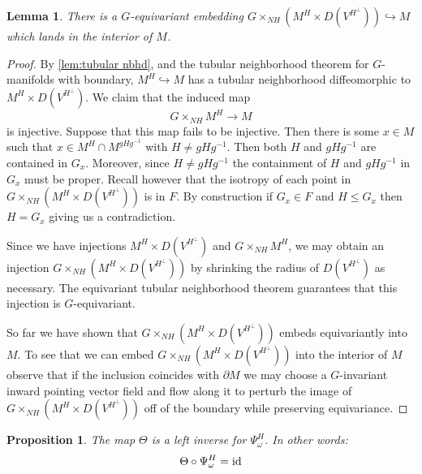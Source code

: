 \documentclass[11pt]{amsart}
\newcommand{\id}{\textup{id}}
\theoremstyle{plain}   %
\newtheorem{lem}[thm]{Lemma}
\newtheorem{prop}[thm]{Proposition}
\theoremstyle{definition}
\theoremstyle{remark}
\numberwithin{equation}{section}
\begin{document}
\begin{lem}\label{lem:embedding}
There is a $G$-equivariant embedding $G\times_{NH}(M^H\times D(V^{H^\perp}))\hookrightarrow M$ which lands in the interior of $M$.
\end{lem}

\begin{proof}
By \cref{lem:tubular nbhd}, and the tubular neighborhood theorem for $G$-manifolds with boundary, $M^H\hookrightarrow M$ has a tubular neighborhood diffeomorphic to $M^H\times D(V^{H^\perp})$. We  claim that the induced map 
\[
G\times_{NH}M^H \to M
\]
is injective. Suppose that this map fails to be injective. Then there is some $x\in M$ such that $x\in M^H\cap M^{gHg^{-1}}$ with $H\neq gHg^{-1}$. Then both $H$ and $gHg^{-1}$ are contained in $G_x$. Moreover, since $H\neq gHg^{-1}$ the containment of $H$ and $gHg^{-1}$ in $G_x$ must be proper. Recall however that the isotropy of each point in $G\times_{NH}(M^H\times D(V^{H^\perp}))$ is in $F$. By construction if $G_x\in F$ and $H\leq G_x$ then $H=G_x$ giving us a contradiction.

Since we have injections $M^H\times D(V^{H^\perp})$ and $G\times_{NH} M^H$, we may obtain an injection $G\times_{NH}(M^H\times D(V^{H^\perp}))$ by shrinking the radius of $D(V^{H^\perp})$ as necessary. The equivariant tubular neighborhood theorem guarantees that this injection is $G$-equivariant.


So far we have shown that $G\times_{NH}(M^H\times D(V^{H^\perp}))$ embeds equivariantly into $M$. To see that we can embed $G\times_{NH}(M^H\times D(V^{H^\perp}))$ into the interior of $M$ observe that if the inclusion coincides with $\partial M$ we may choose a $G$-invariant inward pointing vector field and flow along it to perturb the image of $G\times_{NH}(M^H\times D(V^{H^\perp}))$ off of the boundary while preserving equivariance. 
\end{proof}

\begin{prop}\label{prop:left inverse}
The map $\Theta$ is a left inverse for $\Psi_\omega^H$. In other words:
\[
\Theta\circ \Psi_\omega^H = \id
\]
\end{prop}
\end{document}
